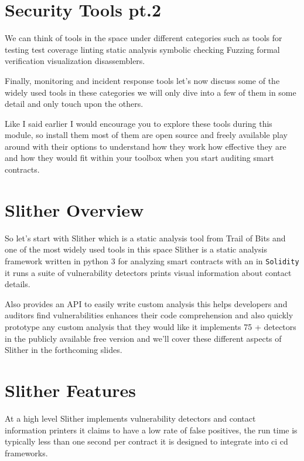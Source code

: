 \section{Security Tools pt.2}

We can think of tools in the space under different categories such as tools for testing test coverage linting static analysis symbolic checking Fuzzing formal verification visualization disassemblers. 

Finally, monitoring and incident response tools let's now discuss some of the widely used tools in these categories we will only dive into a few of them in some detail and only touch upon the others.

Like I said earlier I would encourage you to explore these tools during this module, so install them most of them are open source and freely available play around with their options to understand how they work how effective they are and how they would fit within your toolbox when you start auditing smart contracts.

\section{Slither Overview}

So let's start with Slither which is a static analysis tool from Trail of Bits and one of the most widely used tools in this space Slither is a static analysis framework written in python 3 for analyzing smart contracts with an in \verb|Solidity| it runs a suite of vulnerability detectors prints visual information about contact details.  

Also provides an API to easily write custom analysis this helps developers and auditors find vulnerabilities enhances their code comprehension and also quickly prototype any custom analysis that they would like it implements 75 + detectors in the publicly available free version and we'll cover these different aspects of Slither in the forthcoming slides.

\section{Slither Features}

At a high level Slither implements vulnerability detectors and contact information printers it claims to have a low rate of false positives, the run time is typically less than one second per contract it is designed to integrate into ci cd frameworks. 

